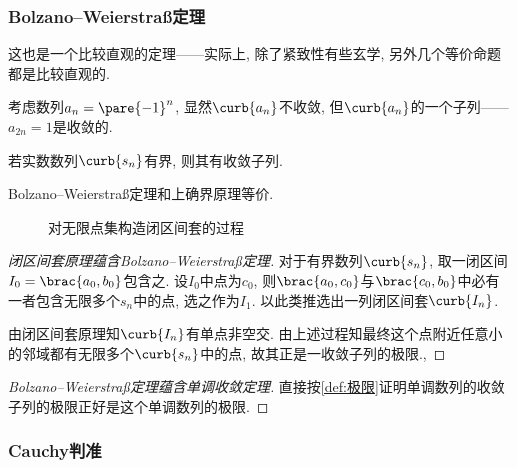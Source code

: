 \documentclass[hidelinks]{ctexart}
\begin{document}

\subsubsection[B-W定理]{Bolzano–Weierstra\ss 定理} %
\label{ssub:b_w定理}

这也是一个比较直观的定理——实际上, 除了紧致性有些玄学, 另外几个等价命题都是比较直观的.
\begin{sample}
    \begin{ex}
        考虑数列$a_n = \pare{-1}^n$, 显然$\curb{a_n}$不收敛, 但$\curb{a_n}$的一个子列——$a_{2n}=1$是收敛的.
    \end{ex}
\end{sample}
\begin{finale}
    \begin{theorem}
        若实数数列$\curb{s_n}$有界, 则其有收敛子列.
    \end{theorem}
    \begin{theorem}[等价性]
        Bolzano–Weierstra\ss 定理和上确界原理等价.
    \end{theorem}
\end{finale}
\begin{figure}[h]
    \centering
    \caption{对无限点集构造闭区间套的过程}
\end{figure}
\begin{proof}[闭区间套原理蕴含Bolzano–Weierstra\ss 定理]
    对于有界数列$\curb{s_n}$, 取一闭区间$I_0 = \brac{a_0,b_0}$包含之. 设$I_0$中点为$c_0$, 则$\brac{a_0, c_0}$与$\brac{c_0, b_0}$中必有一者包含无限多个$s_n$中的点, 选之作为$I_1$. 以此类推选出一列闭区间套$\curb{I_n}$.
    \par
    由闭区间套原理知$\curb{I_n}$有单点非空交. 由上述过程知最终这个点附近任意小的邻域都有无限多个$\curb{s_n}$中的点, 故其正是一收敛子列的极限.,
\end{proof}
\begin{proof}[Bolzano–Weierstra\ss 定理蕴含单调收敛定理]
    直接按\cref{def:极限}证明单调数列的收敛子列的极限正好是这个单调数列的极限.
\end{proof}


\subsubsection{Cauchy判准} %
\label{ssub:cauchy判准}
\end{document}
